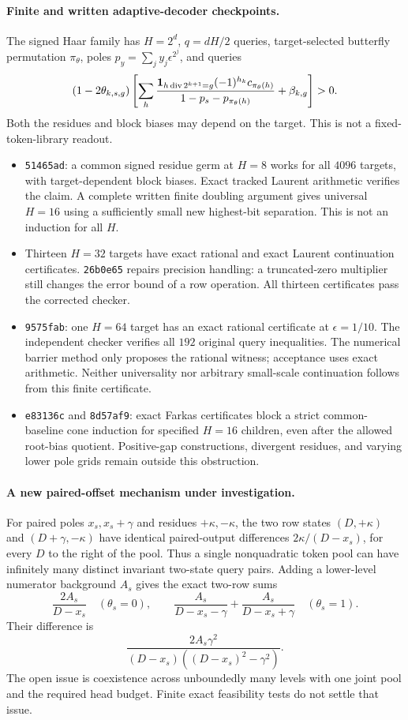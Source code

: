 \documentclass[11pt]{article}
\begin{document}
\paragraph{Finite and written adaptive-decoder checkpoints.}
The signed Haar family has $H=2^d$, $q=dH/2$ queries, target-selected
butterfly permutation $\pi_\theta$, poles
$p_y=\sum_jy_j\epsilon^{2^j}$, and queries
\[
 (1-2\theta_{k,s,g})\left[
 \sum_h\frac{{\bf1}_{h\operatorname{div}2^{k+1}=g}
                    (-1)^{h_k}c_{\pi_\theta(h)}}
                   {1-p_s-p_{\pi_\theta(h)}}+\beta_{k,g}
 \right]>0.
\]
Both the residues and block biases may depend on the target. This is
not a fixed-token-library readout.
\begin{itemize}
\item \texttt{51465ad}: a common signed residue germ at $H=8$ works
for all $4096$ targets, with target-dependent block biases. Exact
tracked Laurent arithmetic verifies the claim. A complete written
finite doubling argument gives universal $H=16$ using a sufficiently
small new highest-bit separation. This is not an induction for all $H$.
\item Thirteen $H=32$ targets have exact rational and exact Laurent
continuation certificates. \texttt{26b0e65} repairs precision handling:
a truncated-zero multiplier still changes the error bound of a row
operation. All thirteen certificates pass the corrected checker.
\item \texttt{9575fab}: one $H=64$ target has an exact rational
certificate at $\epsilon=1/10$. The independent checker verifies all
$192$ original query inequalities. The numerical barrier method only
proposes the rational witness; acceptance uses exact arithmetic.
Neither universality nor arbitrary small-scale continuation follows
from this finite certificate.
\item \texttt{e83136c} and \texttt{8d57af9}: exact Farkas certificates
block a strict common-baseline cone induction for specified $H=16$
children, even after the allowed root-bias quotient. Positive-gap
constructions, divergent residues, and varying lower pole grids remain
outside this obstruction.
\end{itemize}

\paragraph{A new paired-offset mechanism under investigation.}
For paired poles $x_s,x_s+\gamma$ and residues $+\kappa,-\kappa$,
the two row states $(D,+\kappa)$ and $(D+\gamma,-\kappa)$ have
identical paired-output differences $2\kappa/(D-x_s)$, for every
$D$ to the right of the pool. Thus a single nonquadratic token pool
can have infinitely many distinct invariant two-state query pairs.
Adding a lower-level numerator background $A_s$ gives the exact
two-row sums
\[
 \frac{2A_s}{D-x_s}\quad(\theta_s=0),\qquad
 \frac{A_s}{D-x_s-\gamma}+\frac{A_s}{D-x_s+\gamma}
       \quad(\theta_s=1).
\]
Their difference is
\[
 \frac{2A_s\gamma^2}{(D-x_s)((D-x_s)^2-\gamma^2)}.
\]
The open issue is coexistence across unboundedly many levels with one
joint pool and the required head budget. Finite exact feasibility
tests do not settle that issue.
\end{document}

